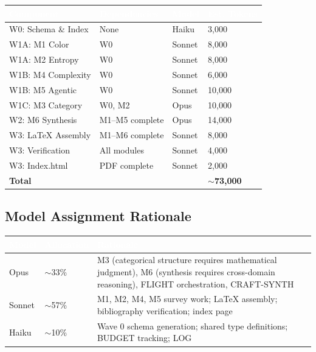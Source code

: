 \documentclass[11pt,letterpaper]{article}
\newcommand{\tableheader}[1]{\textbf{\sffamily\textcolor{white}{#1}}}
\begin{document}
\begin{center}
\begin{tabularx}{\textwidth}{L{3cm}L{2.5cm}C{1.5cm}C{2cm}}
\toprule
{}
\tableheader{Component} & \tableheader{Dependencies} & \tableheader{Model} & \tableheader{Est. Tokens} \\
\midrule
W0: Schema \& Index & None & Haiku & 3,000 \\
W1A: M1 Color & W0 & Sonnet & 8,000 \\
W1A: M2 Entropy & W0 & Sonnet & 8,000 \\
W1B: M4 Complexity & W0 & Sonnet & 6,000 \\
W1B: M5 Agentic & W0 & Sonnet & 10,000 \\
W1C: M3 Category & W0, M2 & Opus & 10,000 \\
W2: M6 Synthesis & M1--M5 complete & Opus & 14,000 \\
W3: LaTeX Assembly & M1--M6 complete & Sonnet & 8,000 \\
W3: Verification & All modules & Sonnet & 4,000 \\
W3: Index.html & PDF complete & Sonnet & 2,000 \\
\midrule
{}
\textbf{Total} & & & \textbf{$\sim$73,000} \\
\bottomrule
\end{tabularx}
\end{center}

\subsection{Model Assignment Rationale}

\begin{center}
\begin{tabularx}{\textwidth}{L{1.5cm}L{2.5cm}X}
\toprule
{}
\tableheader{Model} & \tableheader{Allocation} & \tableheader{Rationale} \\
\midrule
Opus & $\sim$33\% & M3 (categorical structure requires mathematical judgment), M6 (synthesis requires cross-domain reasoning), FLIGHT orchestration, CRAFT-SYNTH \\
Sonnet & $\sim$57\% & M1, M2, M4, M5 survey work; LaTeX assembly; bibliography verification; index page \\
Haiku & $\sim$10\% & Wave 0 schema generation; shared type definitions; BUDGET tracking; LOG \\
\bottomrule
\end{tabularx}
\end{center}
\end{document}
